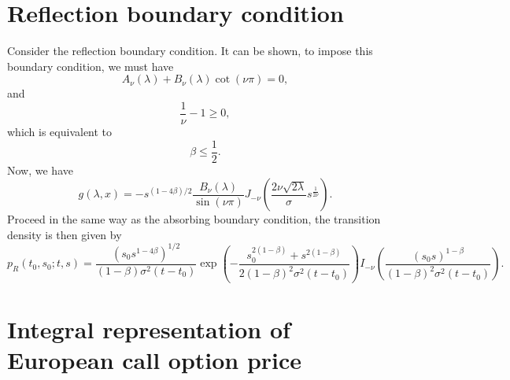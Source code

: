 \documentclass[12pt]{article}
\begin{document}
\section{Reflection boundary condition}

  Consider the reflection boundary condition. It can be shown, to impose this boundary condition, we must have
  \begin{equation}
    A_{\nu}(\lambda)+B_{\nu}(\lambda)\cot(\nu\pi)=0,
  \end{equation}
  and
  \begin{equation}
    \frac{1}{\nu}-1\geq 0,
  \end{equation}
  which is equivalent to
  \begin{equation}
    \beta \leq \frac{1}{2}.
  \end{equation}
  Now, we have
  \begin{equation}
    g(\lambda,x)=-s^{(1-4\beta)/2}\frac{B_{\nu}(\lambda)}{\sin(\nu\pi)}J_{-\nu}\left(\frac{2\nu\sqrt{2\lambda}}{\sigma}s^{\frac{1}{2\nu}}\right).
  \end{equation}
  Proceed in the same way as the absorbing boundary condition, the transition density is then given by
  \begin{equation}
    p_R(t_0,s_0;t,s)=\frac{\left(s_0s^{1-4\beta}\right)^{1/2}}{(1-\beta)\sigma^2(t-t_0)}
    \exp\left(-\frac{s_0^{2(1-\beta)}+s^{2(1-\beta)}}{2(1-\beta)^2\sigma^2(t-t_0)}\right)
    I_{-\nu}\left(\frac{\left(s_0s\right)^{1-\beta}}{(1-\beta)^2\sigma^2(t-t_0)}\right).
  \end{equation}




\section{Integral representation of European call option price}
\end{document}
